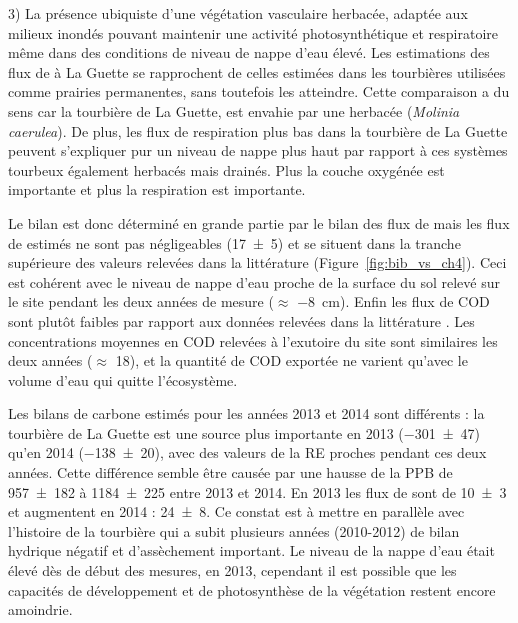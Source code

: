 3) La présence ubiquiste d'une végétation vasculaire herbacée, adaptée aux milieux inondés pouvant maintenir une activité photosynthétique et respiratoire même dans des conditions de niveau de nappe d'eau élevé.
Les estimations des flux de \coo à La Guette se rapprochent de celles estimées dans les tourbières utilisées comme prairies permanentes, sans toutefois les atteindre.
Cette comparaison a du sens car la tourbière de La Guette, est envahie par une herbacée (\textit{Molinia caerulea}).
De plus, les flux de respiration plus bas dans la tourbière de La Guette peuvent s'expliquer pur un niveau de nappe plus haut par rapport à ces systèmes tourbeux également herbacés mais drainés.
Plus la couche oxygénée est importante et plus la respiration est importante.

Le bilan est donc déterminé en grande partie par le bilan des flux de \coo mais les flux de \chh estimés ne sont pas négligeables (\SI{17(5)}{\gcma}) et se situent dans la tranche supérieure des valeurs relevées dans la littérature (Figure~\ref{fig:bib_vs_ch4}). Ceci est cohérent avec le niveau de nappe d'eau proche de la surface du sol relevé sur le site pendant les deux années de mesure ($\approx$ \SI{-8}{\centi\metre}).
Enfin les flux de COD sont plutôt faibles par rapport aux données relevées dans la littérature \citep{koehler2011,vanselow-algan2015}.
Les concentrations moyennes en COD relevées à l'exutoire du site sont similaires les deux années ($\approx$ \SI{18}{\mgl}), et la quantité de COD exportée ne varient qu'avec le volume d'eau qui quitte l'écosystème.

Les bilans de carbone estimés pour les années 2013 et 2014 sont différents : la tourbière de La Guette est une source plus importante en 2013 (\SI{-301(47)}{\gcma}) qu'en 2014 (\SI{-138(20)}{\gcma}), avec des valeurs de la RE proches pendant ces deux années.
Cette différence semble être causée par une hausse de la PPB de \num{957(182)} à \SI{1184(225)}{\gcma} entre 2013 et 2014.
En 2013 les flux de \chh sont de \SI{10(3)}{\gcma} et augmentent en 2014 : \SI{24(8)}{\gcma}.
Ce constat est à mettre en parallèle avec l'histoire de la tourbière qui a subit plusieurs années (2010-2012) de bilan hydrique négatif et d'assèchement important.
Le niveau de la nappe d'eau était élevé dès de début des mesures, en 2013, cependant il est possible que les capacités de développement et de photosynthèse de la végétation restent encore amoindrie.




